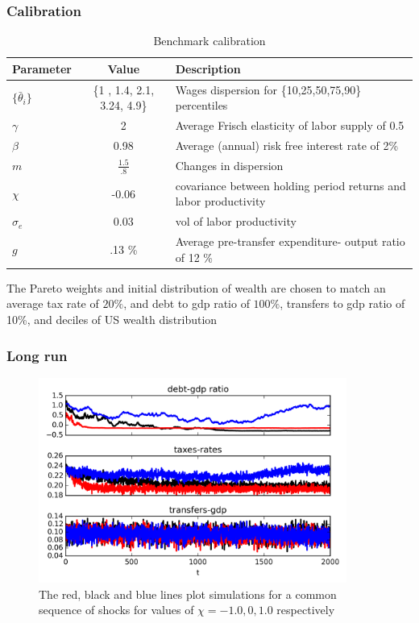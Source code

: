 \documentclass{beamer}
\begin{document}
\begin{frame}
\frametitle{Calibration}

\begin{table}[htp]
\tiny
\begin{tabular}{|l|c|p{4cm}|}
\hline
Parameter & Value & Description   \\ \hline
$\{\bar{\theta}_i\} $ & \{1 ,  1.4,  2.1,  3.24,  4.9\} & Wages dispersion for \{10,25,50,75,90\} percentiles   \\
$\gamma$ & 2 & Average Frisch elasticity of labor supply of 0.5 \\
$\beta$ & 0.98  &Average (annual) risk free interest rate of 2\%   \\
$m$ &$\frac{1.5}{.8}$& Changes in dispersion \\
$\chi$ & -0.06 & covariance between holding period returns and labor productivity \\
$\sigma_e$ & 0.03 & vol of labor productivity\\
$g$ & .13 \%&Average pre-transfer expenditure- output ratio of 12 \% \\\hline
\end{tabular}
\caption{Benchmark calibration}
\label{tab:Parameters}
\end{table}
\scriptsize
The Pareto weights and initial distribution of wealth are chosen to match an average tax rate of $20\%$, and debt to gdp ratio of $100\%$,  transfers to gdp ratio of 10\%,  and deciles of US wealth distribution
\end{frame}

\begin{frame}
\frametitle{Long run}
 {
  \begin{figure}
    \centering
    \includegraphics[width = 0.9\textwidth]{cesplots/long_simulation_debt.png}
    \caption{The red, black and blue lines plot simulations for a common sequence of shocks for values of $\chi=-1.0,0,1.0$ respectively}
  \end{figure}

}

\end{frame}
\end{document}
